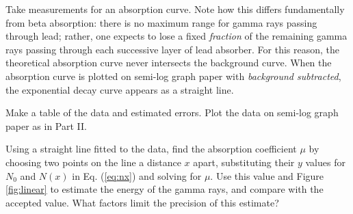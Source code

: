 Take measurements for an absorption curve. Note how this differs fundamentally from beta absorption: there is no maximum range for gamma rays passing through lead; rather, one expects to lose a fixed \emph{fraction} of the remaining gamma rays passing through each successive layer of lead absorber. For this reason, the theoretical absorption curve never intersects the background curve. When the absorption curve is plotted on semi-log graph paper with \emph{background subtracted}, the exponential decay curve appears as a straight line. \myskip

Make a table of the data and estimated errors. Plot the data on semi-log graph paper as in Part II.\myskip

Using a straight line fitted to the data, find the absorption coefficient $\mu$ by choosing two points on the line a distance $x$ apart, substituting their $y$ values for $N_0$ and $N(x)$ in Eq. ({\ref{eq:nx}}) and solving for $\mu$. Use this value and Figure {\ref{fig:linear}} to estimate the energy of the gamma rays, and compare with the accepted value. What factors limit the precision of this estimate?

